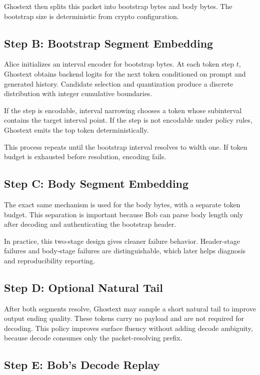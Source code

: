 Ghostext then splits this packet into bootstrap bytes and body bytes. The bootstrap size is deterministic from crypto configuration.

\subsection{Step B: Bootstrap Segment Embedding}

Alice initializes an interval encoder for bootstrap bytes. At each token step $t$, Ghostext obtains backend logits for the next token conditioned on prompt and generated history. Candidate selection and quantization produce a discrete distribution with integer cumulative boundaries.

If the step is encodable, interval narrowing chooses a token whose subinterval contains the target interval point. If the step is not encodable under policy rules, Ghostext emits the top token deterministically.

This process repeats until the bootstrap interval resolves to width one. If token budget is exhausted before resolution, encoding fails.

\subsection{Step C: Body Segment Embedding}

The exact same mechanism is used for the body bytes, with a separate token budget. This separation is important because Bob can parse body length only after decoding and authenticating the bootstrap header.

In practice, this two-stage design gives cleaner failure behavior. Header-stage failures and body-stage failures are distinguishable, which later helps diagnosis and reproducibility reporting.

\subsection{Step D: Optional Natural Tail}

After both segments resolve, Ghostext may sample a short natural tail to improve output ending quality. These tokens carry no payload and are not required for decoding. This policy improves surface fluency without adding decode ambiguity, because decode consumes only the packet-resolving prefix.

\subsection{Step E: Bob's Decode Replay}

